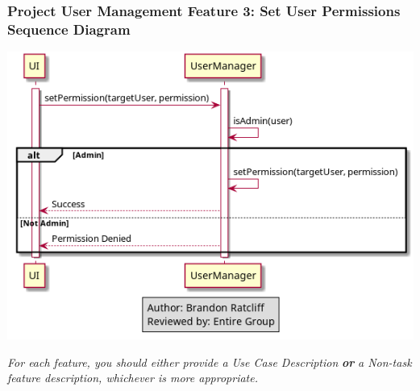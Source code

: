 \documentclass[twoside,letterpaper]{article}
\begin{document}
\subsubsection[Project User Management Feature 3: Set User Permissions Sequence Diagram]{\rmfamily\bfseries\color{black}
	Project User Management Feature 3: Set User Permissions Sequence Diagram}
\hypertarget{RefHeading22059017292}{}
\includegraphics[width=\textwidth]{images/SequenceDiagrams/ProjectUserManagementSetPermission}
\newpage




{\color{black}
	\foreignlanguage{english}{\textit{For each feature, you should either provide a Use Case Description
		}}\foreignlanguage{english}{\textbf{\textit{or}}}\foreignlanguage{english}{\textit{ a Non-task feature description,
		whichever is more appropriate.}}}
\newpage
\end{document}
